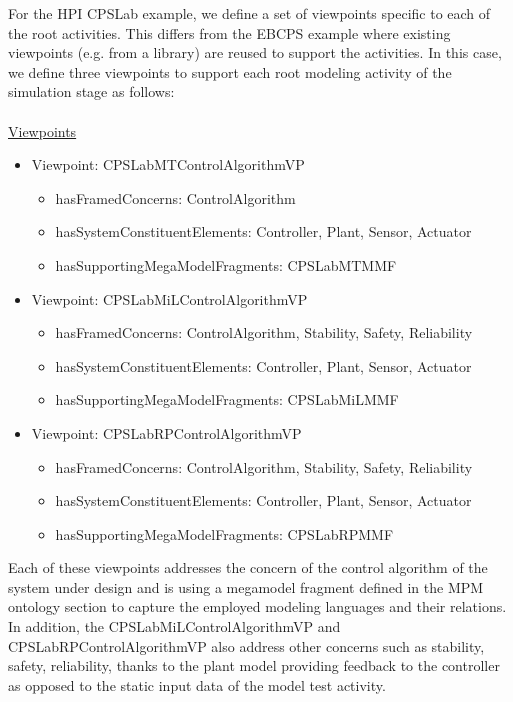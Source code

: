 For the HPI CPSLab example, we define a set of viewpoints specific to each of the root activities. This differs from the EBCPS example where existing viewpoints (e.g. from a library) are reused to support the activities. In this case, we define three viewpoints to support each root modeling activity of the simulation stage as follows:
\\
\\
\noindent\uline{Viewpoints}
    \begin{itemize}
         \item Viewpoint: CPSLabMTControlAlgorithmVP
         \begin{itemize}
            \item hasFramedConcerns: ControlAlgorithm
            \item hasSystemConstituentElements: Controller, Plant, Sensor, Actuator
            \item hasSupportingMegaModelFragments: CPSLabMTMMF
         \end{itemize}
        \item Viewpoint: CPSLabMiLControlAlgorithmVP
         \begin{itemize}
            \item hasFramedConcerns: ControlAlgorithm, Stability, Safety, Reliability
            \item hasSystemConstituentElements: Controller, Plant, Sensor, Actuator
            \item hasSupportingMegaModelFragments: CPSLabMiLMMF
         \end{itemize}
        \item Viewpoint: CPSLabRPControlAlgorithmVP
         \begin{itemize}
            \item hasFramedConcerns: ControlAlgorithm, Stability, Safety, Reliability
            \item hasSystemConstituentElements: Controller, Plant, Sensor, Actuator
            \item hasSupportingMegaModelFragments: CPSLabRPMMF
         \end{itemize}
    \end{itemize}

Each of these viewpoints addresses the concern of the control algorithm of the system under design and is using a megamodel fragment defined in the MPM ontology section to capture the employed modeling languages and their relations. In addition, the CPSLabMiLControlAlgorithmVP and CPSLabRPControlAlgorithmVP also address other concerns such as stability, safety, reliability, thanks to the plant model providing feedback to the controller as opposed to the static input data of the model test activity.

